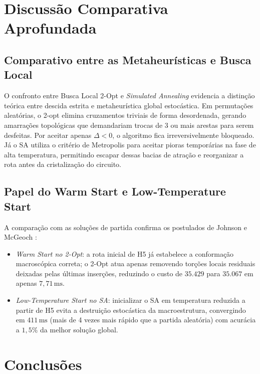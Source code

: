 \documentclass[12pt, a4paper]{article}
\begin{document}
\section{Discussão Comparativa Aprofundada}

\subsection{Comparativo entre as Metaheurísticas e Busca Local}

O confronto entre Busca Local 2-Opt e \textit{Simulated Annealing} evidencia a distinção teórica entre descida estrita e metaheurística global estocástica. Em permutações aleatórias, o 2-opt elimina cruzamentos triviais de forma desordenada, gerando amarrações topológicas que demandariam trocas de 3 ou mais arestas para serem desfeitas. Por aceitar apenas $\Delta < 0$, o algoritmo fica irreversivelmente bloqueado. Já o SA utiliza o critério de Metropolis para aceitar pioras temporárias na fase de alta temperatura, permitindo escapar dessas bacias de atração e reorganizar a rota antes da cristalização do circuito.

\subsection{Papel do Warm Start e Low-Temperature Start}

A comparação com as soluções de partida confirma os postulados de Johnson e McGeoch \cite{johnson1997}:
\begin{itemize}
    \item \textit{Warm Start no 2-Opt}: a rota inicial de H5 já estabelece a conformação macroscópica correta; o 2-Opt atua apenas removendo torções locais residuais deixadas pelas últimas inserções, reduzindo o custo de $35.429$ para $35.067$ em apenas $7{,}71\,\mathrm{ms}$.
    \item \textit{Low-Temperature Start no SA}: inicializar o SA em temperatura reduzida a partir de H5 evita a destruição estocástica da macroestrutura, convergindo em $411\,\mathrm{ms}$ (mais de 4 vezes mais rápido que a partida aleatória) com acurácia a $1{,}5\%$ da melhor solução global.
\end{itemize}

\section{Conclusões}
\end{document}
